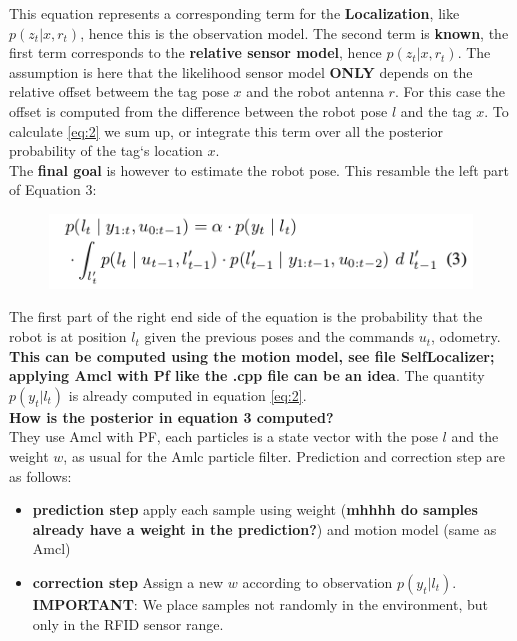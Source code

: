 \documentclass[11pt,a4paper]{article}
\begin{document}
This equation represents a corresponding term for the \textbf{Localization}, like $p(z_t|x,r_t)$, hence this is the observation model.
The second term is \textbf{known}, the first term corresponds to the \textbf{relative sensor model}, hence $p(z_t|x,r_t)$. The assumption is here that the likelihood sensor model \textbf{ONLY} depends on the relative offset betweem the tag pose $x$ and the robot antenna $r$. For this case the offset is computed from the difference between the robot pose $l$ and the tag $x$. To calculate \ref{eq:2} we sum up, or integrate this term over all the posterior probability of the tag`s location $x$. \\
The \textbf{final goal} is however to estimate the robot pose. This resamble the left part of Equation 3:

\begin{figure}[h]
	\center
	\includegraphics[width=.6\textwidth]{figures/eq.png}
\end{figure}

The first part of the right end side of the equation is the probability that the robot is at position $l_t$ given the previous poses and the commands $u_t$, odometry. \textbf{This can be computed using the motion model, see file SelfLocalizer; applying Amcl with Pf like the .cpp file can be an idea}. The quantity $p(y_t|l_t)$ is already computed in equation \ref{eq:2}. \\
\textbf{How is the posterior in equation 3 computed?} \\
They use Amcl with PF, each particles is a state vector with the pose $l$ and the weight $w$, as usual for the Amlc particle filter. Prediction and correction step are as follows: 

\begin{itemize}
\item \textbf{prediction step} apply each sample using weight (\textbf{mhhhh do samples already have a weight in the prediction?}) and motion model (same as Amcl)
\item \textbf{correction step} Assign a new $w$ according to observation $p(y_t|l_t)$. \textbf{IMPORTANT}: We place samples not randomly in the environment, but only in the RFID sensor range.
\end{itemize}
\end{document}
